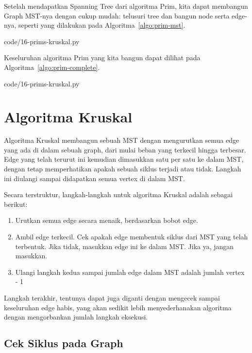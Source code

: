 Setelah mendapatkan Spanning Tree dari algoritma Prim, kita dapat membangun Graph MST-nya dengan cukup mudah: telusuri tree dan bangun node serta edge-nya, seperti yang dilakukan pada Algoritma~\ref{algo:prim-mst}.


                {code/16-prims-kruskal.py}

Keseluruhan algoritma Prim yang kita bangun dapat dilihat pada Algoritma~\ref{algo:prim-complete}.


                {code/16-prims-kruskal.py}


\section{Algoritma Kruskal}

Algoritma Kruskal membangun sebuah MST dengan mengurutkan semua edge yang ada di dalam sebuah graph, dari mulai beban yang terkecil hingga terbesar. Edge yang telah terurut ini kemudian dimasukkan satu per satu ke dalam MST, dengan tetap memperhatikan apakah sebuah siklus terjadi atau tidak. Langkah ini diulangi sampai didapatkan semua vertex di dalam MST.

Secara terstruktur, langkah-langkah untuk algoritma Kruskal adalah sebagai berikut:

\begin{enumerate}
    \item Urutkan semua edge secara menaik, berdasarkan bobot edge.
    \item Ambil edge terkecil. Cek apakah edge membentuk siklus dari MST yang telah terbentuk. Jika tidak, masukkan edge ini ke dalam MST. Jika ya, jangan masukkan.
    \item Ulangi langkah kedua sampai jumlah edge dalam MST adalah jumlah vertex - 1
\end{enumerate}

Langkah terakhir, tentunya dapat juga diganti dengan mengecek sampai keseluruhan edge habis, yang akan sedikit lebih menyederhanakan algoritma dengan mengorbankan jumlah langkah eksekusi.

\subsection{Cek Siklus pada Graph}

